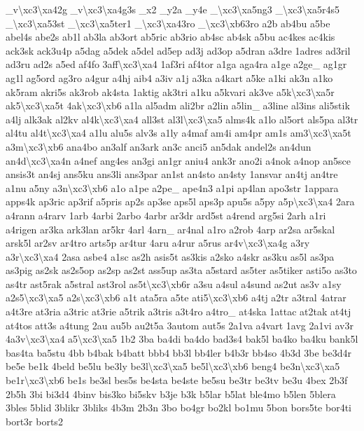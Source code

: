 {\-\_\-v\textbackslash{}xc3\textbackslash{}xa42g \-\_\-v\textbackslash{}xc3\textbackslash{}xa4g3s \-\_\-x2 \-\_\-y2a \-\_\-y4e \-\_\-\textbackslash{}xc3\textbackslash{}xa5ng3 \-\_\-\textbackslash{}xc3\textbackslash{}xa5r4s5 \-\_\-\textbackslash{}xc3\textbackslash{}xa53st \-\_\-\textbackslash{}xc3\textbackslash{}xa5ter1 \-\_\-\textbackslash{}xc3\textbackslash{}xa43ro \-\_\-\textbackslash{}xc3\textbackslash{}xb63ro a2b ab4bu a5be abel4s abe2s ab1l ab3la ab3ort ab5ric ab3rio ab4sc ab4sk a5bu ac4kes ac4kis ack3sk ack3u4p a5dag a5dek a5del ad5ep ad3j ad3op a5dran a3dre 1adres ad3ril ad3ru ad2s a5ed af4fo 3aff\textbackslash{}xc3\textbackslash{}xa4 1af3ri af4tor a1ga aga4ra a1ge a2ge\-\_\- ag1gr ag1l ag5ord ag3ro a4gur a4hj aib4 a3iv a1j a3ka a4kart a5ke a1ki ak3n a1ko ak5ram akri5s ak3rob ak4sta 1aktig ak3tri a1ku a5kvari ak3ve a5k\textbackslash{}xc3\textbackslash{}xa5r ak5\textbackslash{}xc3\textbackslash{}xa5t 4ak\textbackslash{}xc3\textbackslash{}xb6 a1la al5adm ali2br a2lin a5lin\-\_\- a3line al3ins ali5stik a4lj alk3ak al2kv al4k\textbackslash{}xc3\textbackslash{}xa4 all3st al3l\textbackslash{}xc3\textbackslash{}xa5 alms4k a1lo al5ort als5pa al3tr al4tu al4t\textbackslash{}xc3\textbackslash{}xa4 a1lu alu5s alv3s a1ly a4maf am4i am4pr am1s am3\textbackslash{}xc3\textbackslash{}xa5t a3m\textbackslash{}xc3\textbackslash{}xb6 ana4bo an3alf an3ark an3c anci5 an5dak andel2s an4dun an4d\textbackslash{}xc3\textbackslash{}xa4n a4nef ang4es an3gi an1gr aniu4 ank3r ano2i a4nok a4nop an5sce ansis3t an4sj ans5ku ans3li ans3par an1st an4sto an4sty 1ansvar an4tj an4tre a1nu a5ny a3n\textbackslash{}xc3\textbackslash{}xb6 a1o a1pe a2pe\-\_\- ape4n3 a1pi ap4lan apo3str 1appara apps4k ap3ric ap3rif a5pris ap2s ap3se aps5l aps3p apu5s a5py a5p\textbackslash{}xc3\textbackslash{}xa4 2ara a4rann a4rarv 1arb 4arbi 2arbo 4arbr ar3dr ard5st a4rend arg5si 2arh a1ri a4rigen ar3ka ark3lan ar5kr 4arl 4arn\-\_\- ar4nal a1ro a2rob 4arp ar2sa ar5skal arsk5l ar2sv ar4tro arts5p ar4tur 4aru a4rur a5rus ar4v\textbackslash{}xc3\textbackslash{}xa4g a3ry a3r\textbackslash{}xc3\textbackslash{}xa4 2asa asbe4 a1sc as2h asis5t as3kis a2sko a4skr as3ku as5l as3pa as3pig as2sk as2s5op as2sp as2st ass5up as3ta a5stard as5ter as5tiker asti5o as3to as4tr ast5rak a5stral ast3rol as5t\textbackslash{}xc3\textbackslash{}xb6r a3su a4sul a4sund as2ut as3v a1sy a2s5\textbackslash{}xc3\textbackslash{}xa5 a2s\textbackslash{}xc3\textbackslash{}xb6 a1t ata5ra a5te ati5\textbackslash{}xc3\textbackslash{}xb6 a4tj a2tr a3tral 4atrar a4t3re at3ria a3tric at3rie a5trik a3tris a3t4ro a4tro\-\_\- at4ska 1attac at2tak at4tj at4tos att3s a4tung 2au au5b au2t5a 3autom aut5s 2a1va a4vart 1avg 2a1vi av3r 4a3v\textbackslash{}xc3\textbackslash{}xa4 a5\textbackslash{}xc3\textbackslash{}xa5 1b2 3ba ba4di ba4do bad3s4 bak5l ba4ko ba4ku bank5l bas4ta ba5stu 4bb b4bak b4batt bbb4 bb3l bb4ler b4b3r bb4so 4b3d 3be be3d4r be5e be1k 4beld be5lu be3ly be3l\textbackslash{}xc3\textbackslash{}xa5 be5l\textbackslash{}xc3\textbackslash{}xb6 beng4 be3n\textbackslash{}xc3\textbackslash{}xa5 be1r\textbackslash{}xc3\textbackslash{}xb6 be1s be3sl bes5s be4sta be4ste be5su be3tr be3tv be3u 4bex 2b3f 2b5h 3bi bi3d4 4binv bis3ko bi5skv b3je b3k b5lar b5lat ble4mo b5len 5blera 3bles 5blid 3blikr 3bliks 4b3m 2b3n 3bo bo4gr bo2kl bo1mu 5bon bors5te bor4ti bort3r borts2 }
